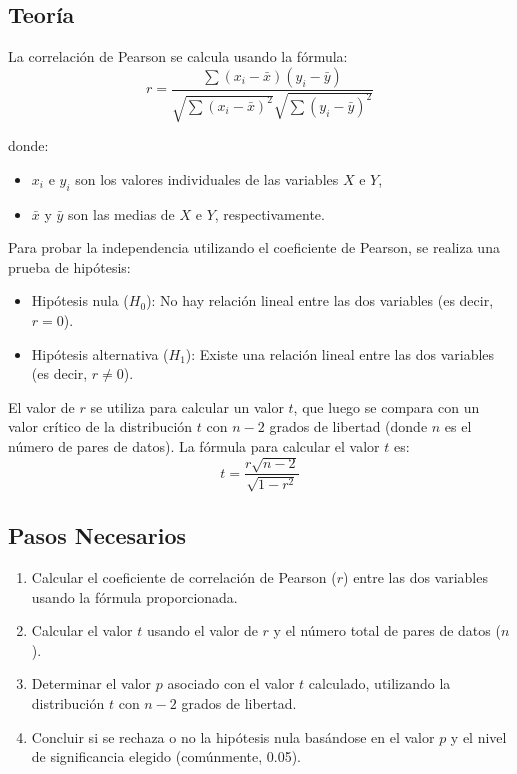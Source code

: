 \documentclass{article}
\begin{document}
\subsection*{Teoría}

La correlación de Pearson se calcula usando la fórmula:
\[ r = \frac{\sum (x_i - \bar{x})(y_i - \bar{y})}{\sqrt{\sum (x_i - \bar{x})^2} \sqrt{\sum (y_i - \bar{y})^2}} \]

donde:
\begin{itemize}
    \item $x_i$ e $y_i$ son los valores individuales de las variables $X$ e $Y$,
    \item $\bar{x}$ y $\bar{y}$ son las medias de $X$ e $Y$, respectivamente.
\end{itemize}

Para probar la independencia utilizando el coeficiente de Pearson, se realiza una prueba de hipótesis:
\begin{itemize}
    \item Hipótesis nula ($H_0$): No hay relación lineal entre las dos variables (es decir, $r=0$).
    \item Hipótesis alternativa ($H_1$): Existe una relación lineal entre las dos variables (es decir, $r \neq 0$).
\end{itemize}

El valor de $r$ se utiliza para calcular un valor $t$, que luego se compara con un valor crítico de la distribución $t$ con $n-2$ grados de libertad (donde $n$ es el número de pares de datos). La fórmula para calcular el valor $t$ es:
\[ t = \frac{r\sqrt{n-2}}{\sqrt{1-r^2}} \]

\subsection*{Pasos Necesarios}

\begin{enumerate}
    \item Calcular el coeficiente de correlación de Pearson ($r$) entre las dos variables usando la fórmula proporcionada.
    \item Calcular el valor $t$ usando el valor de $r$ y el número total de pares de datos ($n$).
    \item Determinar el valor $p$ asociado con el valor $t$ calculado, utilizando la distribución $t$ con $n-2$ grados de libertad.
    \item Concluir si se rechaza o no la hipótesis nula basándose en el valor $p$ y el nivel de significancia elegido (comúnmente, 0.05).
\end{enumerate}
\end{document}
